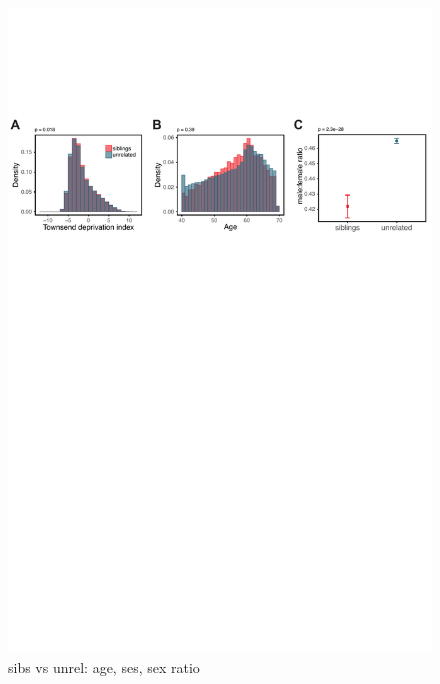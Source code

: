 \documentclass[hidelinks, 12pt]{article}
\begin{document}
\begin{figure}[h!]
\centering
\includegraphics[width=\textwidth]{./supp_figures/sibs_unrel_compare1.pdf}
\caption{sibs vs unrel: age, ses, sex ratio}
\end{figure}
\end{document}
